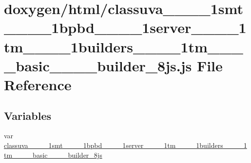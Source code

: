 \hypertarget{classuva____1____1smt____1____1bpbd____1____1server____1____1tm____1____1builders____1____1tm___d870e27f4886ddebcaa196552a9b9737}{}\section{doxygen/html/classuva\+\_\+\+\_\+\_\+\+\_\+1smt\+\_\+\+\_\+\_\+\+\_\+1bpbd\+\_\+\+\_\+\_\+\+\_\+1server\+\_\+\+\_\+\_\+\+\_\+1tm\+\_\+\+\_\+\_\+\+\_\+1builders\+\_\+\+\_\+\_\+\+\_\+1tm\+\_\+\+\_\+\+\_\+\+\_\+basic\+\_\+\+\_\+\+\_\+\+\_\+builder\+\_\+8js.js File Reference}
\label{classuva____1____1smt____1____1bpbd____1____1server____1____1tm____1____1builders____1____1tm___d870e27f4886ddebcaa196552a9b9737}
\subsection*{Variables}
\begin{DoxyCompactItemize}
\item 
var \hyperlink{classuva____1____1smt____1____1bpbd____1____1server____1____1tm____1____1builders____1____1tm___d870e27f4886ddebcaa196552a9b9737_af589046b07d864361ac67a7f9d8f6c7e}{classuva\+\_\+\+\_\+\_\+\+\_\+1smt\+\_\+\+\_\+\_\+\+\_\+1bpbd\+\_\+\+\_\+\_\+\+\_\+1server\+\_\+\+\_\+\_\+\+\_\+1tm\+\_\+\+\_\+\_\+\+\_\+1builders\+\_\+\+\_\+\_\+\+\_\+1tm\+\_\+\+\_\+\+\_\+\+\_\+basic\+\_\+\+\_\+\+\_\+\+\_\+builder\+\_\+8js}
\end{DoxyCompactItemize}


